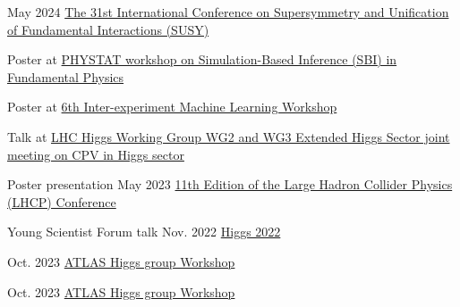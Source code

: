 
\begin{cventries}
    {}
    {May 2024}
    {\href{https://indico.cern.ch/event/1354279/contributions/5942297/}{The 31st International Conference on Supersymmetry and Unification of Fundamental Interactions (SUSY)}}
    {}\vspace*{2mm}

    {}
    {}
    {}
    {
        \begin{cvitems}
        \item Poster at \href{https://indico.cern.ch/event/1355601/contributions/5910202/}{PHYSTAT workshop on Simulation-Based Inference (SBI) in Fundamental Physics}
        \item Poster at \href{https://indico.cern.ch/event/1297159/contributions/5729232/}{6th Inter-experiment Machine Learning Workshop}
        \item Talk at \href{https://indico.cern.ch/event/1230456/\#5-simulation-based-inference-i}{LHC Higgs Working Group WG2 and WG3 Extended Higgs Sector joint meeting on CPV in Higgs sector}
        \end{cvitems}
    }\vspace*{2mm}
    
    {Poster presentation}
    {May 2023}
    {\href{https://indico.cern.ch/event/1198609/contributions/5340462/}{11th Edition of the Large Hadron Collider Physics (LHCP) Conference}}
    {}\vspace*{2mm}
    
    {Young Scientist Forum talk}
    {Nov. 2022}
    {\href{https://indico.cern.ch/event/1086716/contributions/5049260/}{Higgs 2022}}
    {}\vspace*{2mm}


    {}
    {Oct. 2023}
    {\href{https://indico.cern.ch/event/1280531/contributions/5556190/}{ATLAS Higgs group Workshop}}{}\vspace*{2mm}

    {}
    {Oct. 2023}
    {\href{https://indico.cern.ch/event/1280531/contributions/5559532/}{ATLAS Higgs group Workshop}}{}\vspace*{2mm}


\end{cventries}
